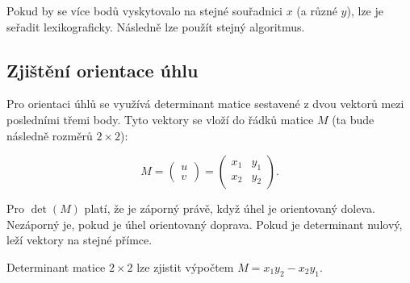 Pokud by se více bodů vyskytovalo na stejné souřadnici $x$ (a různé $y$), lze je seřadit lexikograficky.
Následně lze použít stejný algoritmus.

\subsection{Zjištění orientace úhlu}

Pro orientaci úhlů se využívá determinant matice sestavené z dvou vektorů mezi posledními třemi body.
Tyto vektory se vloží do řádků matice $M$ (ta bude následně rozměrů $2 \times 2$):

\[
    M
    =
    \begin{pmatrix} u \\ v \end{pmatrix}
    =
    \begin{pmatrix}
     x_1 & y_1 \\
     x_2 & y_2
    \end{pmatrix}.
\]

Pro $\det (M)$ platí, že je záporný právě, když úhel je orientovaný doleva.
Nezáporný je, pokud je úhel orientovaný doprava.
Pokud je determinant nulový, leží vektory na stejné přímce.

Determinant matice $2 \times 2$ lze zjistit výpočtem $M = x_1y_2 - x_2y_1$.
